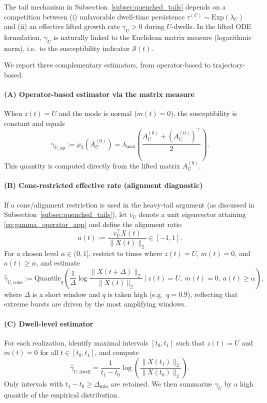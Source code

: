 \documentclass[12pt,a4paper]{article}
\theoremstyle{definition}
\theoremstyle{remark}
\begin{document}
The tail mechanism in Subsection~\ref{subsec:quenched_tails} depends on a competition between
(i) unfavorable dwell-time persistence $\tau^{(U)}\sim\mathrm{Exp}(\lambda_U)$ and
(ii) an effective lifted growth rate $\gamma_U>0$ during $U$-dwells. In the lifted ODE formulation, $\gamma_U$ is naturally linked to the
Euclidean matrix measure (logarithmic norm), i.e.\ to the susceptibility indicator $\mathcal{S}(t)$.

We report three complementary estimators, from operator-based to trajectory-based.

\paragraph{(A) Operator-based estimator via the matrix measure}
When $z(t)=U$ and the mode is normal ($m(t)=0$), the susceptibility is constant and equals
\begin{equation}\label{eq:gamma_operator_app}
	\gamma_{U,\mathrm{op}}
	:=
	\mu_2(A_U^{(0)})
	=
	\lambda_{\max}\!\left(\frac{A_U^{(0)}+(A_U^{(0)})^\top}{2}\right).
\end{equation}
This quantity is computed directly from the lifted matrix $A_U^{(0)}$.

\paragraph{(B) Cone-restricted effective rate (alignment diagnostic)}
If a cone/alignment restriction is used in the heavy-tail argument (as discussed in Subsection~\ref{subsec:quenched_tails}),
let $v_U$ denote a unit eigenvector attaining \eqref{eq:gamma_operator_app} and define the alignment ratio
\begin{equation}\label{eq:alignment_ratio_app}
	a(t):=\frac{v_U^\top X(t)}{\|X(t)\|_2}\in[-1,1].
\end{equation}
For a chosen level $\alpha\in(0,1]$, restrict to times where $z(t)=U$, $m(t)=0$, and $a(t)\ge \alpha$, and estimate
\begin{equation}\label{eq:gamma_cone_app}
	\widehat{\gamma}_{U,\mathrm{cone}}
	:=
	\mathrm{Quantile}_{q}\left(
	\frac{1}{\Delta}\log\frac{\|X(t+\Delta)\|_2}{\|X(t)\|_2}
	\ \Big|\ z(t)=U,\ m(t)=0,\ a(t)\ge \alpha
	\right),
\end{equation}
where $\Delta$ is a short window and $q$ is taken high (e.g.\ $q=0.9$), reflecting that extreme bursts are driven by the most amplifying windows.

\paragraph{(C) Dwell-level estimator}
For each realization, identify maximal intervals $[t_0,t_1]$ such that $z(t)=U$ and $m(t)=0$ for all $t\in[t_0,t_1]$, and compute
\begin{equation}\label{eq:gamma_dwell_app}
	\widehat{\gamma}_{U,\mathrm{dwell}}
	=
	\frac{1}{t_1-t_0}
	\log\!\left(\frac{\|X(t_1)\|_2}{\|X(t_0)\|_2}\right).
\end{equation}
Only intervals with $t_1-t_0\ge \Delta_{\min}$ are retained. We then summarize $\gamma_U$ by a high quantile of the empirical distribution.
\end{document}

